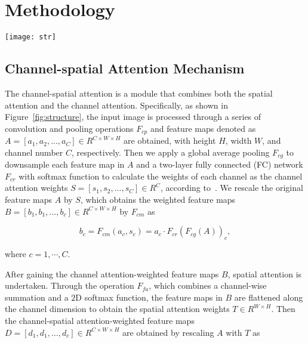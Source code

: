 \documentclass{article}
\begin{document}
\section{Methodology}

\begin{figure*}[!t]
    \centering 
    \texttt{[image: str]}  
    \vspace{-8mm}
    \caption{The framework of our attention module. The upper line (from left to right) and the bottom line (from right to left) present the forward and the gradient backpropagation processes, respectively. A symmetrical Kullback-Leibler (KL) divergence between the weights of each channel in forward propagation and the weights of each feature map in the Grad-CAM is utilized as the loss function in backpropagation to supervise the channel-spatial attention.}\label{fig:structure}
\end{figure*}



\subsection{Channel-spatial Attention Mechanism}

The channel-spatial attention is a module that combines both the spatial attention and the channel attention. Specifically, as shown in Figure~\ref{fig:structure}, the input image is processed through a series of convolution and pooling operations $F_{cp}$ and feature maps denoted as $A=[a_{1}, a_{2},...,a_{C}]\in R^{C\times W\times H}$ are obtained, with height $H$, width $W$, and channel number $C$, respectively. Then we apply a global average pooling $F_{cg}$ to downsample each feature map in $A$ and a two-layer fully connected (FC) network $F_{cr}$ with softmax function to calculate the weights of each channel as the channel attention weights $S=[s_{1}, s_{2},...,s_{C}]\in R^{C}$, according to~\cite{SENet}. We rescale the original feature maps $A$ by $S$, which obtains the weighted feature maps $B=[b_{1},b_{1},...,b_{c}]\in R^{C\times W\times H}$ by $F_{cm}$ as

\begin{equation}
    b_c=F_{cm}(a_{c},s_{c})=a_{c}\cdot F_{cr}\left(F_{cg}(A)\right)_c,
\end{equation}

\noindent where $c=1,\cdots,C$.

After gaining the channel attention-weighted feature maps $B$, spatial attention is undertaken. Through the operation $F_{fa}$, which combines a channel-wise summation and a $2$D softmax function, the feature maps in $B$ are flattened along the channel dimension to obtain the spatial attention weights $T\in R^{W\times H}$. Then the channel-spatial attention-weighted feature maps $D=[d_{1},d_{1},...,d_{c}]\in R^{C\times W\times H}$ are obtained by rescaling $A$ with $T$ as 
\end{document}
